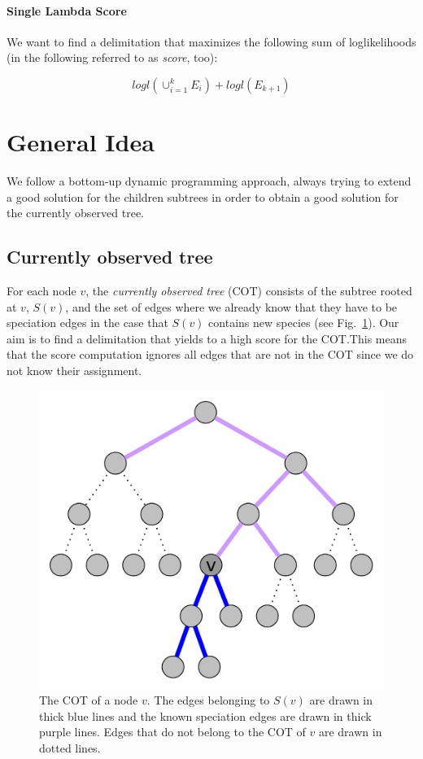 \documentclass{llncs}
\begin{document}
\paragraph{Single Lambda Score}

We want to find a delimitation that maximizes the following sum of loglikelihoods (in the following referred to as \emph{score}, too):

$$logl(\cup_{i=1}^k{E_i}) + logl(E_{k+1})$$

\section{General Idea}

We follow a bottom-up dynamic programming approach, always trying to extend a good solution for the children subtrees in order to obtain a good solution for the currently observed tree.

\subsection{Currently observed tree}

For each node $v$, the \emph{currently observed tree} (COT) consists of the subtree rooted at $v$, $S(v)$, and the set of edges where we already know that they have to be speciation edges in the case that $S(v)$ contains new species (see Fig.~\ref{fig:currently_observed_tree}). Our aim is to find a delimitation that yields to a high score for the COT.\@ This means that the score computation ignores all edges that are not in the COT since we do not know their assignment.

\begin{figure}[h!]
	\centering
	\includegraphics[scale=0.4]{images/currently_observed_tree.pdf}
	\caption{The COT of a node $v$. The edges belonging to $S(v)$ are drawn in thick blue lines and the known speciation edges are drawn in thick purple lines. Edges that do not belong to the COT of $v$ are drawn in dotted lines.}
	\label{fig:currently_observed_tree}
\end{figure}
\end{document}
